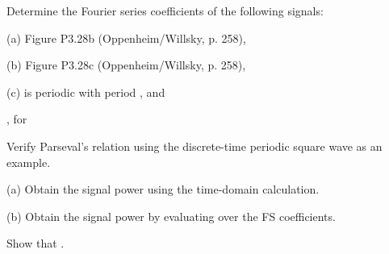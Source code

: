 \documentclass{article}
\begin{document}
\begin{CellGroup}
\begin{CellGroup}
Determine the Fourier series coefficients of the following signals:

(a) Figure P3.28b (Oppenheim/Willsky, p. 258),

(b) Figure P3.28c (Oppenheim/Willsky, p. 258),

(c)  is periodic with period , and 

	, for 




\end{CellGroup}
\begin{CellGroup}
Verify Parseval's relation using the discrete-time periodic square wave as an example. 

(a) Obtain the signal power  using the time-domain calculation.

(b) Obtain the signal power  by evaluating over the FS coefficients.

Show that .




\end{CellGroup}

\end{CellGroup}
\end{document}
